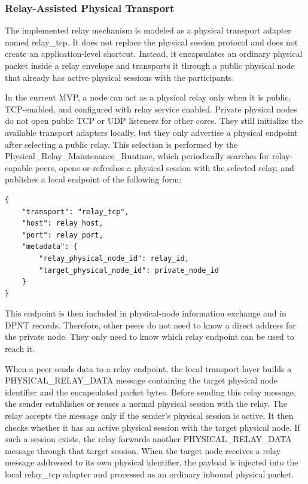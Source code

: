 \documentclass[12pt,a4paper]{article}
\newcommand{\codebreak}[1]{{\footnotesize\ttfamily #1}}
\begin{document}
\subsubsection{Relay-Assisted Physical Transport}
\label{subsec:relay-assisted-physical-transport}

The implemented relay mechanism is modeled as a physical transport adapter named \codebreak{relay\_\allowbreak{}tcp}. It does not replace the physical session protocol and does not create an application-level shortcut. Instead, it encapsulates an ordinary physical packet inside a relay envelope and transports it through a public physical node that already has active physical sessions with the participants.

In the current MVP, a node can act as a physical relay only when it is public, TCP-enabled, and configured with relay service enabled. Private physical nodes do not open public TCP or UDP listeners for other cores. They still initialize the available transport adapters locally, but they only advertise a physical endpoint after selecting a public relay. This selection is performed by the \codebreak{Physical\_\allowbreak{}Relay\_\allowbreak{}Maintenance\_\allowbreak{}Runtime}, which periodically searches for relay-capable peers, opens or refreshes a physical session with the selected relay, and publishes a local endpoint of the following form:

\begin{verbatim}
{
    "transport": "relay_tcp",
    "host": relay_host,
    "port": relay_port,
    "metadata": {
        "relay_physical_node_id": relay_id,
        "target_physical_node_id": private_node_id
    }
}
\end{verbatim}

This endpoint is then included in physical-node information exchange and in DPNT records. Therefore, other peers do not need to know a direct address for the private node. They only need to know which relay endpoint can be used to reach it.

When a peer sends data to a relay endpoint, the local transport layer builds a \codebreak{PHYSICAL\_\allowbreak{}RELAY\_\allowbreak{}DATA} message containing the target physical node identifier and the encapsulated packet bytes. Before sending this relay message, the sender establishes or reuses a normal physical session with the relay. The relay accepts the message only if the sender's physical session is active. It then checks whether it has an active physical session with the target physical node. If such a session exists, the relay forwards another \codebreak{PHYSICAL\_\allowbreak{}RELAY\_\allowbreak{}DATA} message through that target session. When the target node receives a relay message addressed to its own physical identifier, the payload is injected into the local \codebreak{relay\_\allowbreak{}tcp} adapter and processed as an ordinary inbound physical packet.
\end{document}

